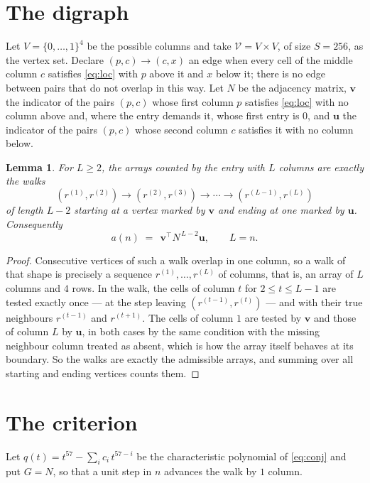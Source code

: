 \documentclass[11pt,a4paper]{article}
\theoremstyle{plain}
\newtheorem{lemma}[theorem]{Lemma}
\theoremstyle{definition}
\begin{document}
\section{The digraph}

Let $V=\{0,\dots,1\}^{4}$ be the possible columns and take
$\mathcal V=V\times V$, of size $S=256$, as the vertex set. Declare $(p,c)\to(c,x)$ an edge
when every cell of the middle column $c$ satisfies \eqref{eq:loc} with $p$ above it and $x$
below it; there is no edge between pairs that do not overlap in this way. Let $N$ be the
adjacency matrix, $\mathbf{v}$ the indicator of the pairs $(p,c)$ whose first column $p$
satisfies \eqref{eq:loc} with no column above and, where the entry demands it, whose first entry is $0$, and $\mathbf{u}$ the indicator of
the pairs $(p,c)$ whose second column $c$ satisfies it with no column below.

\begin{lemma}\label{lem:walk}
For $L\ge2$, the arrays counted by the entry with $L$ columns are exactly the walks
\[
(r^{(1)},r^{(2)})\to(r^{(2)},r^{(3)})\to\cdots\to(r^{(L-1)},r^{(L)})
\]
of length $L-2$ starting at a vertex marked by $\mathbf{v}$ and ending at one marked by
$\mathbf{u}$. Consequently
\[
a(n)\;=\;\,\mathbf{v}^{\!\top}N^{\,L-2}\mathbf{u},\qquad L=n .
\]
\end{lemma}

\begin{proof}
Consecutive vertices of such a walk overlap in one column, so a walk of that shape is
precisely a sequence $r^{(1)},\dots,r^{(L)}$ of columns, that is, an array of $L$ columns
and $4$ rows. In the walk, the cells of column $t$ for $2\le t\le L-1$ are tested
exactly once --- at the step leaving $(r^{(t-1)},r^{(t)})$ --- and with their true
neighbours $r^{(t-1)}$ and $r^{(t+1)}$. The cells of column $1$ are tested by
$\mathbf{v}$ and those of column $L$ by $\mathbf{u}$, in both cases by the same condition
with the missing neighbour column treated as absent, which is how the array itself behaves at
its boundary. So the walks are exactly the admissible arrays, and summing over all starting
and ending vertices counts them.
\end{proof}

\section{The criterion}

Let $q(t)=t^{57}-\sum_i c_i\,t^{57-i}$ be the characteristic polynomial of
\eqref{eq:conj} and put $G=N$, so that a unit step in $n$ advances the walk by
$1$ column.
\end{document}
